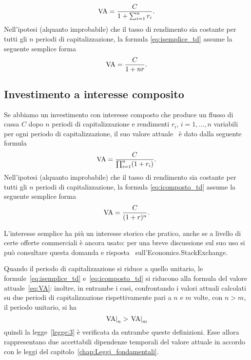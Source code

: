 \begin{equation}
  \label{eq:isemplice_td}
  \mathrm{VA}=\frac{C}{1+\sum_{i=1}^nr_i}.
\end{equation}
Nell'ipotesi (alquanto improbabile) che il tasso di rendimento sia costante per tutti gli $n$ periodi di capitalizzazione,
la formula \eqref{eq:isemplice_td} assume la seguente semplice forma
\[
  \mathrm{VA}=\frac{C}{1+nr}.
\]

\subsection{Investimento a interesse composito}
\label{sec:icomposto_td}

Se abbiamo un investimento con interesse composto che produce un flusso di cassa $C$ dopo $n$ periodi di capitalizzazione
e rendimenti $r_i$, $i= 1, \ldots, n$ variabili per ogni periodo di capitalizzazione, il suo valore attuale \VA\ è dato dalla
seguente formula
\begin{equation}
  \label{eq:icomposto_td}
  \mathrm{VA}=\frac{C}{\prod_{i=1}^n(1+r_i)}.
\end{equation}
Nell'ipotesi  (alquanto improbabile) che il tasso di rendimento sia costante per tutti gli $n$ periodi di capitalizzazione,
la formula \eqref{eq:icomposto_td} assume la seguente semplice forma
\[
  \mathrm{VA}=\frac{C}{(1+r)^n}.
\]

\begin{oss}\label{oss:isemplice}
  L'interesse semplice ha più un interesse storico che pratico, anche se a livello di certe offerte
  commerciali è ancora usato: per una breve discussione sul suo uso si può consultare questa domanda
  e risposta~\cite{Romanchuk2021} sull'Economics.StackExchange.
\end{oss}

\begin{oss}
  Quando il periodo di capitalizzazione si riduce a quello unitario, le formule~\eqref{eq:isemplice_td} e~\eqref{eq:icomposto_td}
  si riducono alla formula del valore attuale~\eqref{eq:VA}: inoltre, in entrambe i casi, confrontando i valori attuali
  calcolati su due periodi di capitalizzazione rispettivamente pari a $n$ e $m$ volte, con $n>m$, il periodo unitario, si ha
  \[
    \left.\mathrm{VA}\right|_{n}> \left.\mathrm{VA}\right|_{m}
  \]
  quindi la legge~\ref{legge:3} è verificata da entrambe queste definizioni. Esse allora rappresentano due accettabili
  dipendenze temporali del valore attuale in accordo con le leggi del capitolo~\ref{chap:Leggi_fondamentali}. 
\end{oss}

